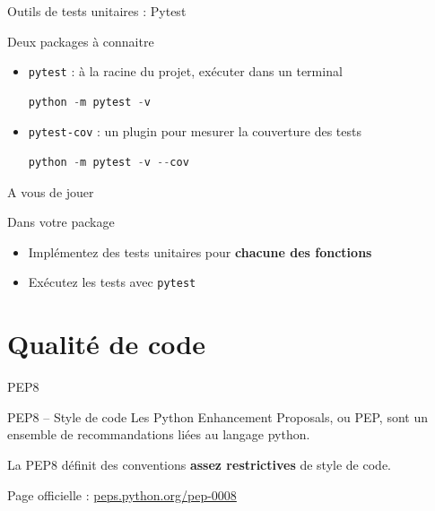 \documentclass[10pt]{beamer}
\begin{document}
\begin{frame}[fragile]{Outils de tests unitaires : Pytest}
  
  \begin{block}{Deux packages à connaitre}
    \medskip
    \begin{itemize}
      \item<+-> \texttt{pytest} : à la racine du projet, exécuter dans un terminal
\begin{lstlisting}[language=python, numbers=none]
python -m pytest -v
\end{lstlisting}
      \item<+-> \texttt{pytest-cov} : un plugin pour mesurer la couverture des tests
\begin{lstlisting}[language=python, numbers=none]
python -m pytest -v --cov
\end{lstlisting}

  \end{itemize}
  \end{block}
  
\end{frame}

\begin{frame}{A vous de jouer}

  \begin{block}{Dans votre package}
    \medskip
    \begin{itemize}
      \item Implémentez des tests unitaires pour \textbf{chacune des fonctions}
      \item Exécutez les tests avec \texttt{pytest}
    \end{itemize}
  \end{block}
  
\end{frame}




\section{Qualité de code}

\begin{frame}{PEP8}

  \begin{block}{PEP8 -- Style de code}
    \medskip
    Les Python Enhancement Proposals, ou PEP, sont un ensemble de recommandations liées au langage python.

    La PEP8 définit des conventions \textbf{assez restrictives} de style de code.
  \end{block}

  Page officielle : \url{peps.python.org/pep-0008}

\end{frame}
\end{document}
